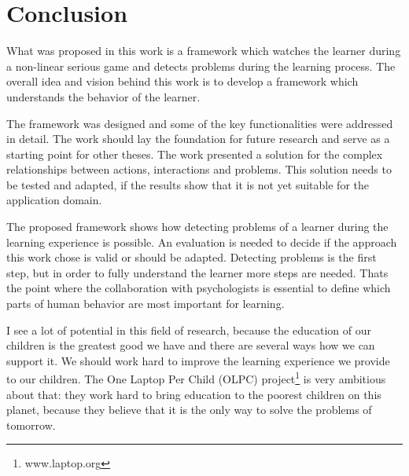 
\chapter{Conclusion}
What was proposed in this work is a framework which watches the learner
during a non-linear serious game and detects problems during the learning
process. The overall idea and vision behind this work is to develop a
framework which understands the behavior of the learner.

The framework was designed and some of the key functionalities were addressed
in detail. The work should lay the foundation for future research and serve as
a starting point for other theses. The work presented a solution for the
complex relationships between actions, interactions and problems. This
solution needs to be tested and adapted, if the results show that it is not
yet suitable for the application domain.

The proposed framework shows how detecting problems of a learner
during the learning experience is possible. An evaluation is needed to decide
if the approach this work chose is valid or should be adapted. Detecting problems is the first step, but in
order to fully understand the learner more steps are needed. Thats the point where
the collaboration with psychologists is essential to define which parts of human
behavior are most important for learning.

I see a lot of potential in this field of research, because the
education of our children is the greatest good we have and there are several
ways how we can support it. We should work hard to
improve the learning experience we provide to our children. The One Laptop Per Child (OLPC)
project\footnote{www.laptop.org} is very ambitious about that: they work hard to bring education to the poorest children on this
planet, because they believe that it is the only way to solve the problems of
tomorrow.
